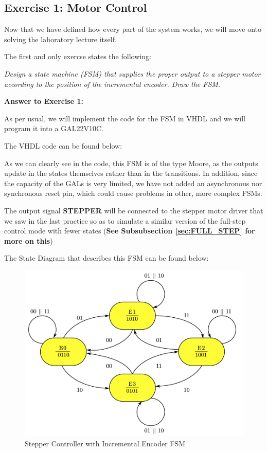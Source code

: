 \clearpage

\subsection{Exercise 1: Motor Control}

Now that we have defined how every part of the system works, we will move onto solving the laboratory lecture itself. \medskip

The first and only exercse states the following:\medskip

\textit{Design a state machine (FSM) that supplies the proper output to a stepper motor according to the position of the incremental encoder. Draw the FSM.} \medskip

\textbf{\large Answer to Exercise 1:}\medskip

As per usual, we will implement the code for the FSM in VHDL and we will program it into a GAL22V10C. \medskip

The VHDL code can be found below:\medskip


As we can clearly see in the code, this FSM is of the type Moore, as the outputs update in the states themselves rather than in the transitions. In addition, since the capacity of the GALs is very limited, we have not added an asynchronous nor synchronous reset pin, which could cause problems in other, more complex FSMs.  \medskip

The output signal \textbf{STEPPER} will be connected to the stepper motor driver that we saw in the last practice so as to simulate a similar version of the full-step control mode with fewer states (\textbf{See Subsubsection \ref{sec:FULL_STEP} for more on this})\medskip

The State Diagram that describes this FSM can be found below:

\begin{figure}[H]
    \centering
    \includegraphics[scale = 0.75]{Graphics/VHDL/Practice 4/EXERCISE_FSM.pdf}
    \caption{Stepper Controller with Incremental Encoder FSM}
    \label{fig:ENCODER_FSM}
\end{figure}

\clearpage